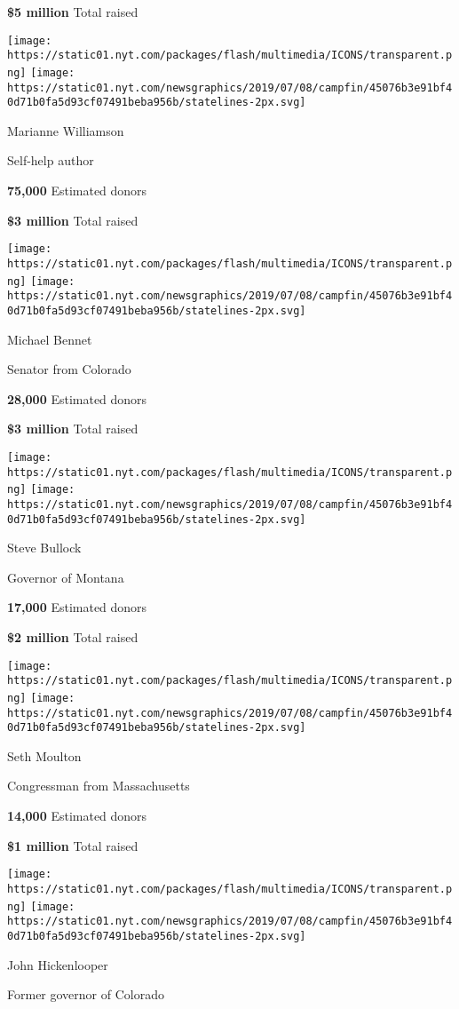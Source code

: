\textbf{\$5 million} Total raised

\texttt{[image: https://static01.nyt.com/packages/flash/multimedia/ICONS/transparent.png]}
\texttt{[image: https://static01.nyt.com/newsgraphics/2019/07/08/campfin/45076b3e91bf40d71b0fa5d93cf07491beba956b/statelines-2px.svg]}

Marianne Williamson

Self-help author

\textbf{75,000} Estimated donors

\textbf{\$3 million} Total raised

\texttt{[image: https://static01.nyt.com/packages/flash/multimedia/ICONS/transparent.png]}
\texttt{[image: https://static01.nyt.com/newsgraphics/2019/07/08/campfin/45076b3e91bf40d71b0fa5d93cf07491beba956b/statelines-2px.svg]}

Michael Bennet

Senator from Colorado

\textbf{28,000} Estimated donors

\textbf{\$3 million} Total raised

\texttt{[image: https://static01.nyt.com/packages/flash/multimedia/ICONS/transparent.png]}
\texttt{[image: https://static01.nyt.com/newsgraphics/2019/07/08/campfin/45076b3e91bf40d71b0fa5d93cf07491beba956b/statelines-2px.svg]}

Steve Bullock

Governor of Montana

\textbf{17,000} Estimated donors

\textbf{\$2 million} Total raised

\texttt{[image: https://static01.nyt.com/packages/flash/multimedia/ICONS/transparent.png]}
\texttt{[image: https://static01.nyt.com/newsgraphics/2019/07/08/campfin/45076b3e91bf40d71b0fa5d93cf07491beba956b/statelines-2px.svg]}

Seth Moulton

Congressman from Massachusetts

\textbf{14,000} Estimated donors

\textbf{\$1 million} Total raised

\texttt{[image: https://static01.nyt.com/packages/flash/multimedia/ICONS/transparent.png]}
\texttt{[image: https://static01.nyt.com/newsgraphics/2019/07/08/campfin/45076b3e91bf40d71b0fa5d93cf07491beba956b/statelines-2px.svg]}

John Hickenlooper

Former governor of Colorado

